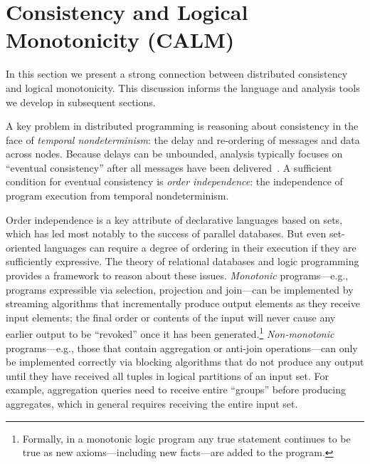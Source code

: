 \section{Consistency and Logical \\ Monotonicity (CALM)}
In this section we present a strong connection between distributed consistency and logical monotonicity.  This discussion informs the language and analysis tools we develop in subsequent sections.

A key problem in distributed programming is reasoning about consistency in the face of {\em
temporal nondeterminism}: the delay and re-ordering of messages and data across
nodes.  Because delays can be unbounded, analysis typically focuses on ``eventual consistency'' after all messages have been delivered~\cite{vogels}.  A sufficient condition for eventual consistency is {\em order independence}: the independence of program execution from temporal
nondeterminism.

Order independence is a key attribute of declarative languages based on sets, which has led most notably to the success of parallel databases.  But even set-oriented languages can require a degree of ordering in their execution if they are sufficiently expressive.
The theory of relational databases and logic programming provides a framework to reason about these issues. \emph{Monotonic} programs---e.g., programs expressible via selection, projection and join---can be implemented by streaming algorithms that incrementally produce output elements as they receive input elements; the final order or contents of the input will never cause any earlier output to be ``revoked'' once it has been generated.\footnote{Formally, in a monotonic logic program\kc{,} any true statement continues to be true as new axioms---including new facts---are added to the program.}   
\emph{Non-monotonic} programs---e.g., those that contain aggregation or anti-join operations---can only be implemented correctly via blocking algorithms that do not produce any output until they have received all tuples in logical partitions of an input set. 
For example, aggregation queries need to receive entire ``groups'' before producing aggregates, which in general requires receiving the entire input set.

